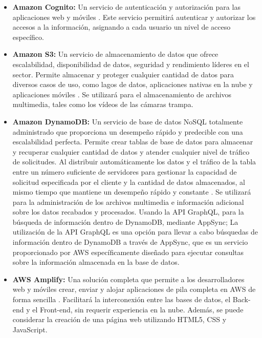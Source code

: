 \begin{itemize}
    \item \textbf{Amazon Cognito: }Un servicio de autenticación y autorización para las aplicaciones web y móviles \cite{29}. Este servicio permitirá autenticar y autorizar los accesos a la información, asignando a cada usuario un nivel de acceso específico.
    \item \textbf{Amazon S3: }Un servicio de almacenamiento de datos que ofrece escalabilidad, disponibilidad de datos, seguridad y rendimiento líderes en el sector. Permite almacenar y proteger cualquier cantidad de datos para diversos casos de uso, como lagos de datos, aplicaciones nativas en la nube y aplicaciones móviles \cite{30}. Se utilizará para el almacenamiento de archivos multimedia, tales como los vídeos de las cámaras trampa.
    \item \textbf{Amazon DynamoDB:} Un servicio de base de datos NoSQL totalmente administrado que proporciona un desempeño rápido y predecible con una escalabilidad perfecta. Permite crear tablas de base de datos para almacenar y recuperar cualquier cantidad de datos y atender cualquier nivel de tráfico de solicitudes. Al distribuir automáticamente los datos y el tráfico de la tabla entre un número suficiente de servidores para gestionar la capacidad de solicitud especificada por el cliente y la cantidad de datos almacenados, al mismo tiempo que mantiene un desempeño rápido y constante \cite{31}. Se utilizará para la administración de los archivos multimedia e información adicional sobre los datos recabados y procesados. Usando la API GraphQL, para la búsqueda de información dentro de DynamoDB, mediante AppSync; La utilización de la API GraphQL es una opción para llevar a cabo búsquedas de información dentro de DynamoDB a través de AppSync, que es un servicio proporcionado por AWS específicamente diseñado para ejecutar consultas sobre la información almacenada en la base de datos.
    \item \textbf{AWS Amplify:} Una solución completa que permite a los desarrolladores web y móviles crear, enviar y alojar aplicaciones de pila completa en AWS de forma sencilla \cite{32}. Facilitará la interconexión entre las bases de datos, el Back-end y el Front-end, sin requerir experiencia en la nube. Además, se puede considerar la creación de una página web utilizando HTML5, CSS y JavaScript.

\end{itemize}

